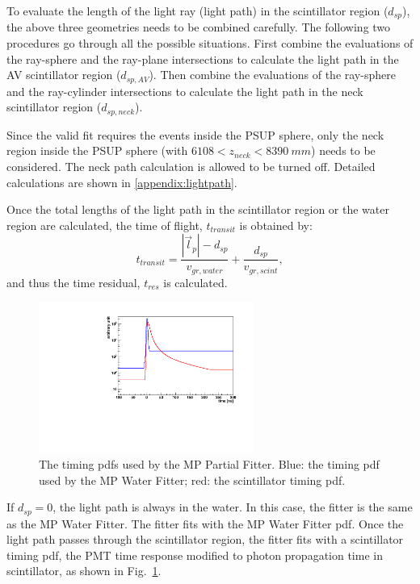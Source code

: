 To evaluate the length of the light ray (light path) in the scintillator region ($d_{sp}$), the above three geometries needs to be combined carefully. The following two procedures go through all the possible situations. First combine the evaluations of the ray-sphere and the ray-plane intersections to calculate the light path in the AV scintillator region ($d_{sp,AV}$). Then combine the evaluations of the ray-sphere and the ray-cylinder intersections to calculate the light path in the neck scintillator region ($d_{sp,neck}$).

Since the valid fit requires the events inside the PSUP sphere, only the neck region inside the PSUP sphere (with $6108<z_{neck}<8390~mm$) needs to be considered. The neck path calculation is allowed to be turned off. Detailed calculations are shown in \ref{appendix:lightpath}.

Once the total lengths of the light path in the scintillator region or the water region are calculated, the time of flight, $t_{transit}$ is obtained by:
\begin{equation}
t_{transit} = \frac{|\vec{l}_p|-d_{sp}}{v_{gr,water}} +\frac{d_{sp}}{v_{gr,scint}},
\end{equation}
and thus the time residual, $t_{res}$ is calculated.

\begin{figure}[htbp]
	\centering	
	\includegraphics[width=7cm]{scintpdf.pdf}
	\caption{The timing pdfs used by the MP Partial Fitter. Blue: the timing pdf used by the MP Water Fitter; red: the scintillator timing pdf.}
	\label{partialpdf}
\end{figure}

If $d_{sp}=0$, the light path is always in the water. In this case, the fitter is the same as the MP Water Fitter. The fitter fits with the MP Water Fitter pdf. Once the light path passes through the scintillator region, the fitter fits with a scintillator timing pdf, the PMT time response modified to photon propagation time in scintillator, as shown in Fig.~\ref{partialpdf}.

